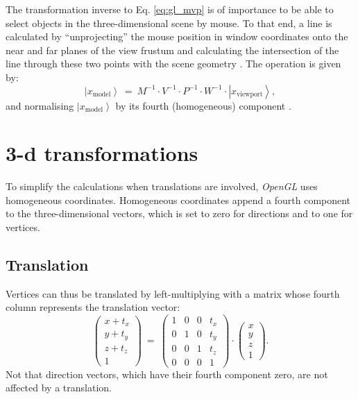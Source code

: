 The transformation inverse to Eq. \ref{eq:gl_mvp} is of importance to be able to select objects in the three-dimensional
scene by mouse. To that end, a line is calculated by ``unprojecting'' the mouse position in window coordinates
onto the near and far planes of the view frustum and calculating the intersection of the line through these
two points with the scene geometry \cite{web_gl_unproject}. The operation is given by:
\begin{equation}
	\left|x_{\mathrm{model}}\right> \ =\ M^{-1} \cdot V^{-1} \cdot P^{-1} \cdot  W^{-1} \cdot  \left| x_{\mathrm{viewport}} \right>,
\end{equation}
and normalising $\left|x_{\mathrm{model}}\right>$ by its fourth (homogeneous) component \cite{web_gl_unproject}.



\section{3-d transformations}

To simplify the calculations when translations are involved, \textit{OpenGL} uses homogeneous coordinates.
Homogeneous coordinates append a fourth component to the three-dimensional vectors, which is set to zero for
directions and to one for vertices.


\subsection{Translation}
Vertices can thus be translated by left-multiplying with a matrix whose fourth column represents the translation
vector:
\begin{equation}
	\left( \begin{array}{c} x + t_x \\ y + t_y \\ z + t_z \\ 1 \end{array} \right) 
	\ =\  
	\left( \begin{array}{cccc} 
		1 & 0 & 0 & t_x \\
		0 & 1 & 0 & t_y \\
		0 & 0 & 1 & t_z \\
		0 & 0 & 0 & 1
	\end{array} \right) \cdot
	\left( \begin{array}{c} x \\ y \\ z \\ 1 \end{array} \right).
\end{equation}
Not that direction vectors, which have their fourth component zero, are not affected by a translation.


